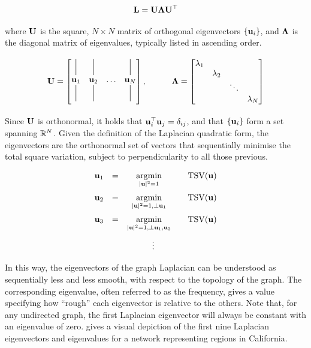 \begin{equation}
    \mathbf{L} = \mathbf{U} \mathbf{\Lambda} \mathbf{U}^\top
\end{equation}

where $\mathbf{U}$ is the square, $N \times N$ matrix of orthogonal eigenvectors $\{\mathbf{u}_i\}$, and $\mathbf{\Lambda}$ is the diagonal matrix of eigenvalues, typically listed in ascending order. 

\begin{equation*}
    \U = \begin{bmatrix}
        \vertbar{4.5}{0.5}{-3} & \vertbar{4.5}{0.5}{-3} & & \vertbar{4.5}{0.5}{-3} \\
        \uu_1    & \uu_2    & \ldots & \uu_N    \\
        \vertbar{4.5}{0.5}{0.5} & \vertbar{4.5}{0.5}{0.5} & & \vertbar{4.5}{0.5}{0.5} 
    \end{bmatrix}, \quad\quad\quad \LAM = \begin{bmatrix}
        \lambda_1 & & & \\
        & \lambda_2 & & \\
        & & \ddots & \\
        & & & \lambda_N
    \end{bmatrix}
\end{equation*}

Since $\mathbf{U}$ is orthonormal, it holds that $\mathbf{u}_i^\top \mathbf{u}_j = \delta_{ij}$, and that $\{\mathbf{u}_i\}$ form a set spanning $\mathbb{R}^N$. Given the definition of the Laplacian quadratic form, the eigenvectors are the orthonormal set of vectors that sequentially minimise the total square variation, subject to perpendicularity to all those previous. 

$$
\begin{matrix}
    \mathbf{u}_1 & = & \underset{|\mathbf{u}|^2 = 1}{\text{argmin}} \quad & \text{TSV}(\mathbf{u}) \\[0.5cm]
    \mathbf{u}_2 & = & \underset{|\mathbf{u}|^2 = 1, \perp \mathbf{u}_1}{\text{argmin}} \quad & \text{TSV}(\mathbf{u}) \\[0.5cm]
    \mathbf{u}_3 & = & \underset{|\mathbf{u}|^2 = 1, \perp \mathbf{u}_1, \mathbf{u}_2}{\text{argmin}} \quad & \text{TSV}(\mathbf{u}) \\[0.5cm]
    & & \vdots & 
\end{matrix}
$$

In this way, the eigenvectors of the graph Laplacian can be understood as sequentially less and less smooth, with respect to the topology of the graph. The corresponding eigenvalue, often referred to as the frequency, gives a value specifying how ``rough'' each eigenvector is relative to the others. Note that, for any undirected graph, the first Laplacian eigenvector will always be constant with an eigenvalue of zero.  gives a visual depiction of the first nine Laplacian eigenvectors and eigenvalues for a network representing regions in California. 

